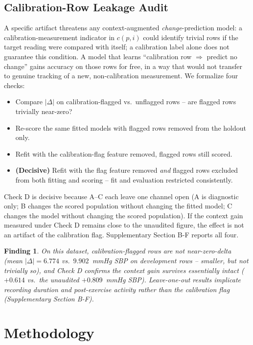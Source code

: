 \documentclass[journal]{IEEEtran}
\newtheorem{finding}{Finding}
\begin{document}
\subsection{Calibration-Row Leakage Audit}
\label{sec:leakage}
A specific artifact threatens any context-augmented \emph{change}-prediction model: a calibration-measurement indicator in $c(p,i)$ could identify trivial rows if the target reading were compared with itself; a calibration label alone does not guarantee this condition. A model that learns ``calibration row $\Rightarrow$ predict no change'' gains accuracy on those rows for free, in a way that would not transfer to genuine tracking of a new, non-calibration measurement. We formalize four checks:
\begin{itemize}
\item[\textbf{A}] Compare $|\Delta|$ on calibration-flagged vs.\ unflagged rows -- are flagged rows trivially near-zero?
\item[\textbf{B}] Re-score the same fitted models with flagged rows removed from the holdout only.
\item[\textbf{C}] Refit with the calibration-flag feature removed, flagged rows still scored.
\item[\textbf{D}] \textbf{(Decisive)} Refit with the flag feature removed \emph{and} flagged rows excluded from both fitting and scoring -- fit and evaluation restricted consistently.
\end{itemize}
Check D is decisive because A--C each leave one channel open (A is diagnostic only; B changes the scored population without changing the fitted model; C changes the model without changing the scored population). If the context gain measured under Check D remains close to the unaudited figure, the effect is not an artifact of the calibration flag. Supplementary Section B-F reports all four.
\begin{finding}
On this dataset, calibration-flagged rows are \emph{not} near-zero-delta (mean $|\Delta|=6.774$ vs.\ $9.902$~mmHg SBP on development rows -- smaller, but not trivially so), and Check D confirms the context gain survives essentially intact ($+0.614$ vs.\ the unaudited $+0.809$~mmHg SBP). Leave-one-out results implicate recording duration and post-exercise activity rather than the calibration flag (Supplementary Section B-F).
\end{finding}
\section{Methodology}
\label{sec:methods}
\end{document}
